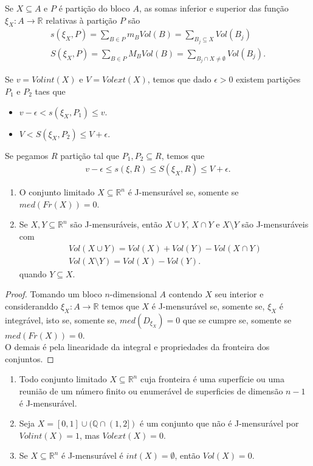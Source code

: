 Se $X\subseteq A$ e $P$ é partição do bloco $A$, as somas inferior e superior das função $\xi_{X}:A\to\mathbb{R}$ relativas à partição $P$ são
\begin{align*}
  s(\xi_{X},P)=\sum_{B\in P}m_BVol(B)=\sum_{B_j\subseteq  X}Vol(B_j)\\
  S(\xi_{X},P)=\sum_{B\in P}M_BVol(B)=\sum_{B_j\cap X\neq\emptyset}Vol(B_j).
\end{align*}
\begin{note}
  Se $v=Volint(X)$ e $V=Volext(X)$, temos que dado $\epsilon>0$ existem partições $P_1$ e $P_2$ taes que
  \begin{itemize}
    \item $v-\epsilon< s(\xi_{X},P_1)\leq v $.
    \item $V< S(\xi_{X},P_2)\leq V+\epsilon $.
  \end{itemize}
  Se pegamos $R$ partição tal que $P_1,P_2\subseteq R$, temos que
  \begin{align*}
    v-\epsilon\leq s(\xi,R)\leq S(\xi_{X},R)\leq V+\epsilon.
  \end{align*}
\end{note}
\begin{theorem}
  \begin{enumerate}
    \item O conjunto limitado $X\subseteq \mathbb{R}^{n}$ é J-mensurável se, somente se $med(Fr(X))=0$.
    \item Se $X,Y\subseteq\mathbb{R}^{n}$ são J-mensuráveis, então $X\cup Y$, $X\cap Y$ e $X\setminus Y$ são J-mensuráveis com
      \begin{align*}
        Vol(X\cup Y)=Vol(X)+Vol(Y)-Vol(X\cap Y)\\
        Vol(X\setminus Y)=Vol(X)-Vol(Y).
      \end{align*}
      quando $Y\subseteq X$.
  \end{enumerate}
\end{theorem}
\begin{proof} 
  Tomando um bloco $n$-dimensional $A$ contendo $X$ seu interior e consideranddo $\xi_{X}:A\to\mathbb{R}$ temos que $X$ é J-mensurável se, somente se, $\xi_X$ é integrável, isto se, somente se, $med(D_{\xi_X})=0$ que se cumpre se, somente se $med(Fr(X))=0$.\\
  O demais é pela linearidade da integral e propriedades da fronteira dos conjuntos.
\end{proof}
\begin{example}
  \begin{enumerate}
    \item Todo conjunto limitado $X\subseteq \mathbb{R}^{n}$ cuja fronteira é uma superfície ou uma reunião de um número finito ou enumerável de superficies de dimensão $n-1$ é J-mensurável.
    \item Seja $X=[0,1]\cup(\mathbb{Q}\cap(1,2])$ é um conjunto que não é J-mensurável por $Volint(X)=1$, mas $Volext(X)=0$.
    \item Se $X\subseteq\mathbb{R}^{n}$ é J-mensurável é $int(X)=\emptyset$, então $Vol(X)=0$. 
  \end{enumerate}
\end{example}
